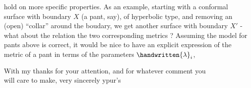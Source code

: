 
hold on more specific properties. As an example, starting with a  conformal surface with boundary $X$ (a pant, say), of hyperbolic type, and removing an \deleted{-}(open) ``collar'' around the boudary, we get another surface with boundary $X'$ - what about the relation  the two corresponding metrics ? Assuming the model for pants above is correct, it would be nice to have an explicit expression of the metric of a pant in terms of the parameters $\handwritten{\lambda}_i$,

With my thanks for your attention, and for whatever comment you\\
will care to make, very sincerely ypur's\\

